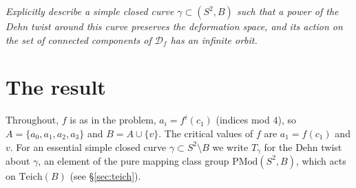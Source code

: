 \documentclass[11pt]{article}
\theoremstyle{definition}
\newcommand{\Teich}{\mathrm{Teich}}
\newcommand{\PMod}{\mathrm{PMod}}
\newcommand{\D}{\mathcal D}
\begin{document}
\emph{Explicitly describe a simple closed curve $\gamma\subset(S^2,B)$ such that a power of the Dehn twist around this curve preserves the deformation space, and its action on the set of connected components of $\D_f$ has an infinite orbit.}

\section{The result}

Throughout, $f$ is as in the problem, $a_i=f^{i}(c_1)$ (indices mod $4$), so $A=\{a_0,a_1,a_2,a_3\}$ and $B=A\cup\{v\}$. The critical values of $f$ are $a_1=f(c_1)$ and $v$. For an essential simple closed curve $\gamma\subset S^2\setminus B$ we write $T_\gamma$ for the Dehn twist about $\gamma$, an element of the pure mapping class group $\PMod(S^2,B)$, which acts on $\Teich(B)$ (see \S\ref{sec:teich}).
\end{document}
